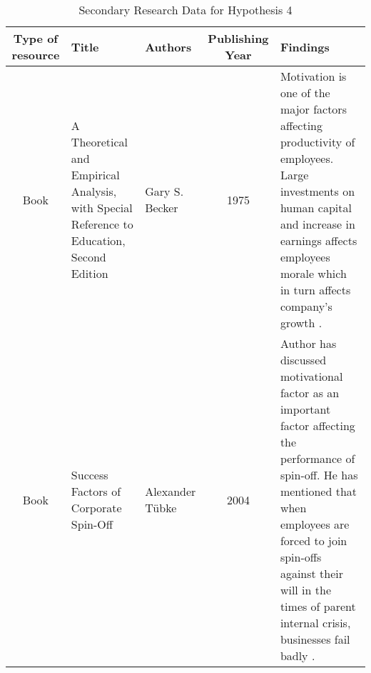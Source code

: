 \begin{table} [h!]
	\centering
	\hspace*{-1cm}
	\begin{tabular}{|c|L{3cm}|L{2cm}|c|L{3cm}|}
		\hline
		\textbf{Type of resource} & \textbf{Title} & \textbf{Authors} & \textbf{Publishing Year} & \textbf{Findings} \\
		\hline
		Book & A Theoretical  and Empirical Analysis, with Special Reference to Education, Second Edition & Gary S. Becker  & 1975 & Motivation is one of the major
		factors affecting productivity
		of
		employees.
		Large
		investments on human capital
		and increase in earnings
		affects employees morale
		which
		in
		turn
		affects
		company’s growth \cite{59}. \\
		\hline
		Book & Success Factors 
		of
		Corporate 
		Spin-Off & Alexander Tübke & 2004 & Author
		has
		discussed
		motivational factor as an
		important factor affecting the
		performance of spin-off. He
		has mentioned that when
		employees are forced to join
		spin-offs against their will in
		the times of parent internal
		crisis, businesses fail badly \cite{57}.\\
		\hline
	\end{tabular}
	\hspace*{-1cm}
	\caption{Secondary Research Data for Hypothesis 4}
	\label{table6}
\end{table}
